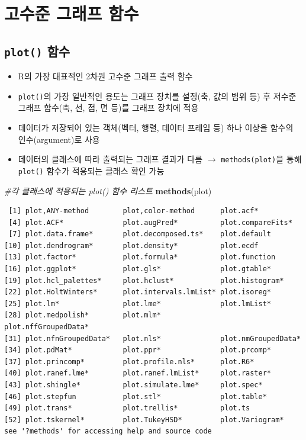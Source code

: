 \documentclass[
  11pt,
]{krantz}
\newenvironment{Shaded}{\begin{snugshade}}{\end{snugshade}}
\newcommand{\CommentTok}[1]{\textcolor[rgb]{0.37,0.37,0.37}{\textit{#1}}}
\newcommand{\KeywordTok}[1]{\textcolor[rgb]{0.27,0.27,0.27}{\textbf{#1}}}
\newcommand{\NormalTok}[1]{#1}
\providecommand{\tightlist}{%
  \setlength{\itemsep}{0pt}\setlength{\parskip}{0pt}}
\begin{document}
\normalsize

\hypertarget{high-level-graph}{%
\section{고수준 그래프 함수}\label{high-level-graph}}

\hypertarget{plot-fun}{%
\subsection{\texorpdfstring{\textbf{\texttt{plot()} 함수}}{plot() 함수}}\label{plot-fun}}

\begin{itemize}
\tightlist
\item
  R의 가장 대표적인 2차원 고수준 그래프 출력 함수
\item
  \texttt{plot()}의 가장 일반적인 용도는 그래프 장치를 설정(축, 값의 범위 등) 후 저수준 그래프 함수(축, 선, 점, 면 등)를 그래프 장치에 적용
\item
  데이터가 저장되어 있는 객체(벡터, 행렬, 데이터 프레임 등) 하나 이상을 함수의 인수(argument)로 사용
\item
  데이터의 클래스에 따라 출력되는 그래프 결과가 다름 \(\rightarrow\) \texttt{methods(plot)}을 통해 \texttt{plot()} 함수가 적용되는 클래스 확인 가능
\end{itemize}

\footnotesize

\begin{Shaded}
\begin{Highlighting}[]
\CommentTok{#각 클래스에 적용되는 plot() 함수 리스트}
\KeywordTok{methods}\NormalTok{(plot)}
\end{Highlighting}
\end{Shaded}

\begin{verbatim}
 [1] plot,ANY-method        plot,color-method      plot.acf*             
 [4] plot.ACF*              plot.augPred*          plot.compareFits*     
 [7] plot.data.frame*       plot.decomposed.ts*    plot.default          
[10] plot.dendrogram*       plot.density*          plot.ecdf             
[13] plot.factor*           plot.formula*          plot.function         
[16] plot.ggplot*           plot.gls*              plot.gtable*          
[19] plot.hcl_palettes*     plot.hclust*           plot.histogram*       
[22] plot.HoltWinters*      plot.intervals.lmList* plot.isoreg*          
[25] plot.lm*               plot.lme*              plot.lmList*          
[28] plot.medpolish*        plot.mlm*              plot.nffGroupedData*  
[31] plot.nfnGroupedData*   plot.nls*              plot.nmGroupedData*   
[34] plot.pdMat*            plot.ppr*              plot.prcomp*          
[37] plot.princomp*         plot.profile.nls*      plot.R6*              
[40] plot.ranef.lme*        plot.ranef.lmList*     plot.raster*          
[43] plot.shingle*          plot.simulate.lme*     plot.spec*            
[46] plot.stepfun           plot.stl*              plot.table*           
[49] plot.trans*            plot.trellis*          plot.ts               
[52] plot.tskernel*         plot.TukeyHSD*         plot.Variogram*       
see '?methods' for accessing help and source code
\end{verbatim}
\end{document}
